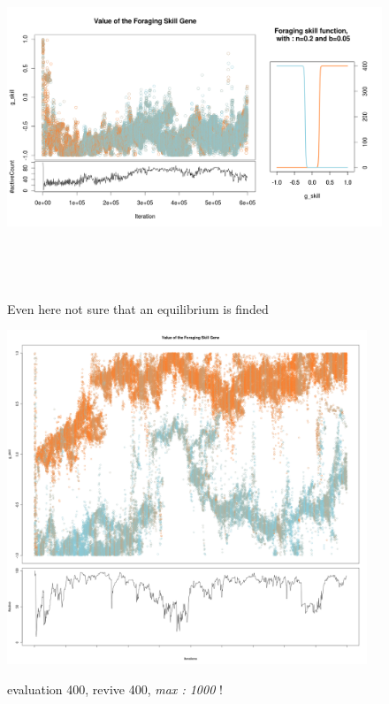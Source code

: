 \documentclass[a4paper,10pt]{article}
\begin{document}
\begin{figure}
	\caption{Even here not sure that an equilibrium is finded} 

	\begin{center}

	\label{fig:moyen}
	\includegraphics[height=10cm]{tanh_moyenp1}
	\end{center}

\end{figure}

\begin{figure}

	\caption{ evaluation 400, revive 400, \emph{max : 1000} !} 
	\begin{center}
		\label{fig:quick}
		\includegraphics[height=10cm]{tanh_findQuickly}
	\end{center}

\end{figure}
\end{document}
